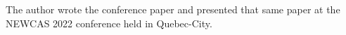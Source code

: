 The author wrote the conference paper \citep{Bouzid2022NEWCAS} and presented that same paper at the NEWCAS 2022 conference held in Quebec-City.